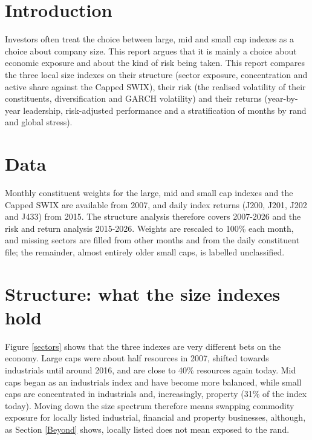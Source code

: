 \documentclass[11pt,preprint]{elsarticle}
\numberwithin{equation}{section}
\numberwithin{figure}{section}
\numberwithin{table}{section}
\begin{document}

\headsep 35pt %




\section{\texorpdfstring{Introduction
\label{Introduction}}{Introduction }}\label{introduction}

Investors often treat the choice between large, mid and small cap
indexes as a choice about company size. This report argues that it is
mainly a choice about economic exposure and about the kind of risk being
taken. This report compares the three local size indexes on their
structure (sector exposure, concentration and active share against the
Capped SWIX), their risk (the realised volatility of their constituents,
diversification and GARCH volatility) and their returns (year-by-year
leadership, risk-adjusted performance and a stratification of months by
rand and global stress).

\section{Data}\label{data}

Monthly constituent weights for the large, mid and small cap indexes and
the Capped SWIX are available from 2007, and daily index returns (J200,
J201, J202 and J433) from 2015. The structure analysis therefore covers
2007-2026 and the risk and return analysis 2015-2026. Weights are
rescaled to 100\% each month, and missing sectors are filled from other
months and from the daily constituent file; the remainder, almost
entirely older small caps, is labelled unclassified.

\section{Structure: what the size indexes
hold}\label{structure-what-the-size-indexes-hold}

Figure \ref{sectors} shows that the three indexes are very different
bets on the economy. Large caps were about half resources in 2007,
shifted towards industrials until around 2016, and are close to 40\%
resources again today. Mid caps began as an industrials index and have
become more balanced, while small caps are concentrated in industrials
and, increasingly, property (31\% of the index today). Moving down the
size spectrum therefore means swapping commodity exposure for locally
listed industrial, financial and property businesses, although, as
Section \ref{Beyond} shows, locally listed does not mean exposed to the
rand.
\end{document}
